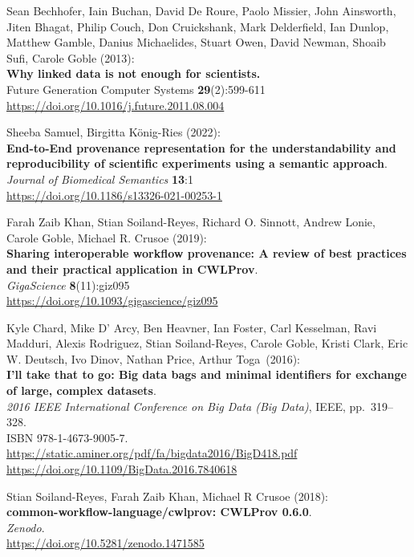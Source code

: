 \documentclass[10pt,letterpaper]{article}
\begin{document}
\begin{thebibliography}{10}
\begin{small}
Sean Bechhofer, Iain Buchan, David De Roure, Paolo
Missier, John Ainsworth, Jiten Bhagat, Philip Couch, Don Cruickshank,
Mark Delderfield, Ian Dunlop, Matthew Gamble, Danius Michaelides, Stuart
Owen, David Newman, Shoaib Sufi, Carole Goble (2013):\\
\textbf{Why linked data is not enough for scientists.}\\
Future Generation Computer Systems \textbf{29}(2):599-611\\
\url{https://doi.org/10.1016/j.future.2011.08.004}

 Sheeba Samuel, Birgitta König-Ries (2022): \\
\textbf{End-to-End provenance representation for the understandability and reproducibility of scientific experiments using a semantic approach}. \\
\emph{Journal of Biomedical Semantics} \textbf{13}:1 \\
\url{https://doi.org/10.1186/s13326-021-00253-1}



 Farah Zaib Khan, Stian Soiland-Reyes, Richard O.
Sinnott, Andrew Lonie, Carole Goble, Michael R. Crusoe (2019):\\
\textbf{Sharing interoperable workflow provenance: A review of best
practices and their practical application in CWLProv}.\\
\emph{GigaScience} \textbf{8}(11):giz095\\
\url{https://doi.org/10.1093/gigascience/giz095}

Kyle Chard, Mike D' Arcy, Ben Heavner, Ian Foster, Carl
Kesselman, Ravi Madduri, Alexis Rodriguez, Stian Soiland-Reyes, Carole
Goble, Kristi Clark, Eric W. Deutsch, Ivo Dinov, Nathan Price, Arthur
Toga~(2016):\\
\textbf{I'll take that to go: Big data bags and minimal identifiers for
exchange of large, complex datasets}.\\
\emph{2016 IEEE International Conference on Big Data (Big Data)}, IEEE,
pp.~319--328.\\
ISBN 978-1-4673-9005-7.\\
\url{https://static.aminer.org/pdf/fa/bigdata2016/BigD418.pdf}\\
\url{https://doi.org/10.1109/BigData.2016.7840618}

Stian Soiland-Reyes, Farah Zaib Khan, Michael R Crusoe (2018):\\
\textbf{common-workflow-language/cwlprov: CWLProv 0.6.0}.\\
\emph{Zenodo}.\\
\url{https://doi.org/10.5281/zenodo.1471585}


\end{small}
\end{thebibliography}
\end{document}
